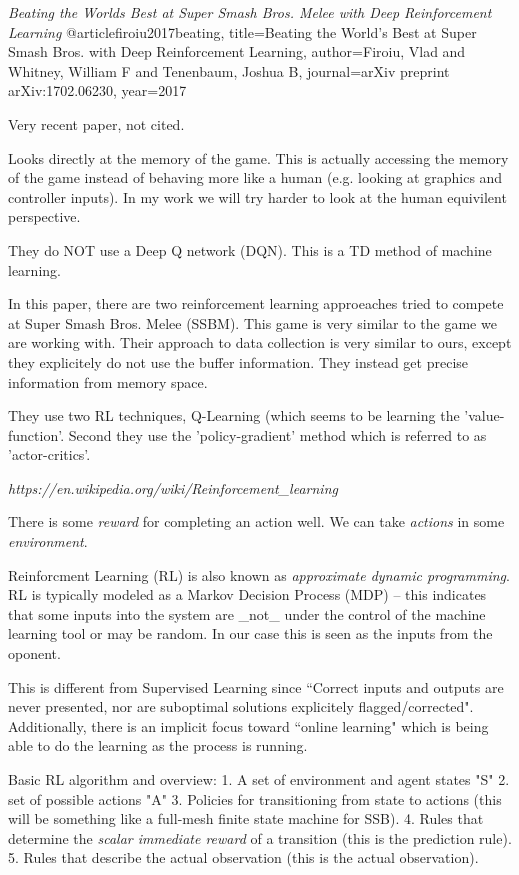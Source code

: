 
\textit{Beating the Worlds Best at Super Smash Bros. Melee with Deep Reinforcement Learning}
@article{firoiu2017beating,
  title={Beating the World's Best at Super Smash Bros. with Deep Reinforcement Learning},
  author={Firoiu, Vlad and Whitney, William F and Tenenbaum, Joshua B},
  journal={arXiv preprint arXiv:1702.06230},
  year={2017}
}

Very recent paper, not cited.

Looks directly at the memory of the game. 
This is actually accessing the memory of the game instead of behaving more like a human (e.g. looking at graphics and controller inputs).
In my work we will try harder to look at the human equivilent perspective.

They do NOT use a Deep Q network (DQN).
This is a TD method of machine learning.

In this paper, there are two reinforcement learning approeaches tried to compete at Super Smash Bros. Melee (SSBM).
This game is very similar to the game we are working with.
Their approach to data collection is very similar to ours, except they explicitely do not use the buffer information.
They instead get precise information from memory space.

They use two RL techniques, Q-Learning (which seems to be learning the 'value-function'.
Second they use the 'policy-gradient' method which is referred to as 'actor-critics'.



\textit{https://en.wikipedia.org/wiki/Reinforcement_learning}

There is some \textit{reward} for completing an action well.
We can take \textit{actions} in some \textit{environment}.

Reinforcment Learning (RL) is also known as \textit{approximate dynamic programming}.
RL is typically modeled as a Markov Decision Process (MDP) -- this indicates that some inputs into the system are _not_ under the control of the machine learning tool or may be random.
In our case this is seen as the inputs from the oponent.

This is different from Supervised Learning since ``Correct inputs and outputs are never presented, nor are suboptimal solutions explicitely flagged/corrected".
Additionally, there is an implicit focus toward ``online learning" which is being able to do the learning as the process is running.

Basic RL algorithm and overview:
1. A set of environment and agent states "S"
2. set of possible actions "A"
3. Policies for transitioning from state to actions (this will be something like a full-mesh finite state machine for SSB).
4. Rules that determine the \textit{scalar immediate reward} of a transition 
  (this is the prediction rule).
5. Rules that describe the actual observation 
  (this is the actual observation).

